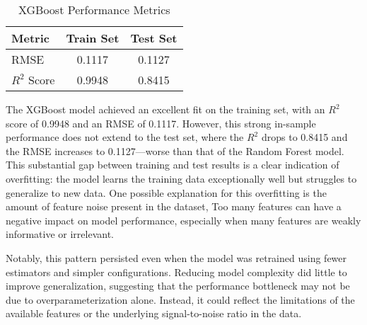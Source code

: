\begin{table}[H]
\centering
\caption{XGBoost Performance Metrics}
\label{tab:xgboost-performance}
\begin{tabular}{lcc}
\toprule
\textbf{Metric} & \textbf{Train Set} & \textbf{Test Set} \\
\midrule
RMSE           & 0.1117             & 0.1127            \\
$R^2$ Score    & 0.9948             & 0.8415            \\
\bottomrule
\end{tabular}
\end{table}

The XGBoost model achieved an excellent fit on the training set, with an $R^2$ score of 0.9948 and an RMSE of 0.1117.
However, this strong in-sample performance does not extend to the test set, where the $R^2$ drops to 0.8415 and the RMSE increases to 0.1127—worse than that of the Random Forest model. 
This substantial gap between training and test results is a clear indication of overfitting: the model learns the training data exceptionally well but struggles to generalize to new data.
One possible explanation for this overfitting is the amount of feature noise present in the dataset, Too many features can have a negative impact on model performance, especially when many features are weakly informative or irrelevant.

Notably, this pattern persisted even when the model was retrained using fewer estimators and simpler configurations. 
Reducing model complexity did little to improve generalization, suggesting that the performance bottleneck may not be due to overparameterization alone. 
Instead, it could reflect the limitations of the available features or the underlying signal-to-noise ratio in the data.

